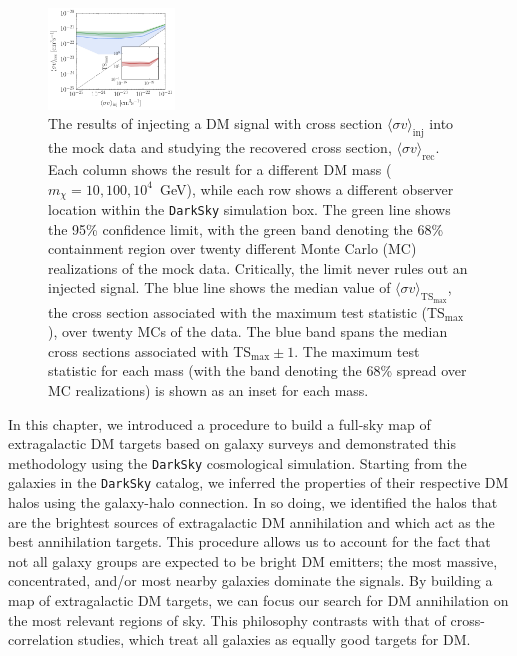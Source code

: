 \begin{figure}[t]
   \includegraphics[width=0.30\textwidth]{ch-darksky/plots//signal_recovery_10TeV_loc2}
   \caption{The results of injecting a DM signal with cross section $\langle \sigma v \rangle_\text{inj}$ into the mock data and studying the recovered cross section, $\langle \sigma v \rangle_\text{rec}$.  Each column shows the result for a different DM mass ($m_\chi = 10, 100, 10^4$~GeV), while each row shows a different observer location within the \texttt{DarkSky} simulation box.  The green line shows the 95\% confidence limit, with the green band denoting the 68\% containment region over twenty different Monte Carlo (MC) realizations of the mock data.  Critically, the limit never rules out an injected signal.  The blue line shows the median value of $\langle \sigma v\rangle_{\text{TS}_\text{max}}$, the cross section associated with the maximum test statistic (TS$_\text{max}$), over twenty MCs of the data. The blue band spans the median cross sections associated with TS$_\text{max} \pm 1$.  The maximum test statistic for each mass (with the band denoting the 68\% spread over MC realizations) is shown as an inset for each mass.  %
   }
   \label{fig:DSinjsiglocs}
\end{figure}
 
In this chapter, we introduced a procedure to build a full-sky map of extragalactic DM targets based on galaxy surveys and demonstrated this methodology using the \texttt{DarkSky} cosmological simulation.   Starting from the galaxies in the \texttt{DarkSky} catalog, we inferred the properties of their respective DM halos using the galaxy-halo connection.  In so doing, we identified the halos that are the brightest sources of extragalactic DM annihilation and which act as the best annihilation targets.  This procedure allows us to account for the fact that not all galaxy groups are expected to be bright DM emitters; the most massive, concentrated, and/or most nearby galaxies dominate the signals.  By building a map of extragalactic DM targets, we can focus our search for DM annihilation on the most relevant regions of sky.  This philosophy contrasts with that of cross-correlation studies, which treat all galaxies as equally good targets for DM.   

